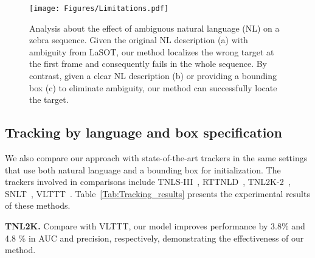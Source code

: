 \begin{figure*}[t]
\centering
\texttt{[image: Figures/Limitations.pdf]}
\vspace{-1mm}
\caption{Analysis about the effect of ambiguous natural language (NL) on a zebra sequence. 
Given the original NL description (a) with ambiguity from LaSOT, our method localizes the wrong target at the first frame and consequently fails in the whole sequence. 
By contrast, given a clear NL description (b) or providing a bounding box (c) to eliminate ambiguity, our method can successfully locate the target.
} 
\label{Fig:casestudy2}
\vspace{-1mm}
\end{figure*}


\begin{table}[t]
\centering
\setlength{\tabcolsep}{3pt}
\renewcommand{\arraystretch}{1.15}
\caption{Comparison of our method with state-of-the-art algorithms for visual grounding on the val set of RefCOCOg.}
\vspace{-1mm}
\label{Tab:groundingresult}
\vspace{-1mm}
\end{table}

\subsection{Tracking by language and box specification}
We also compare our approach with state-of-the-art trackers in the same settings that use both natural language and a bounding box for initialization. 
The trackers involved in comparisons include TNLS-III~\cite{li2017tracking}, RTTNLD~\cite{feng2020real}, TNL2K-2~\cite{TNL2K}, SNLT~\cite{feng2021siamese}, VLTTT~\cite{guo2022divert}. Table~\ref{Tab:Tracking_results} presents the experimental results of these methods.

\noindent\textbf{TNL2K.}
Compare with VLTTT, our model improves performance by 3.8\% and 4.8 \% in AUC and precision, respectively, demonstrating the effectiveness of our method.

